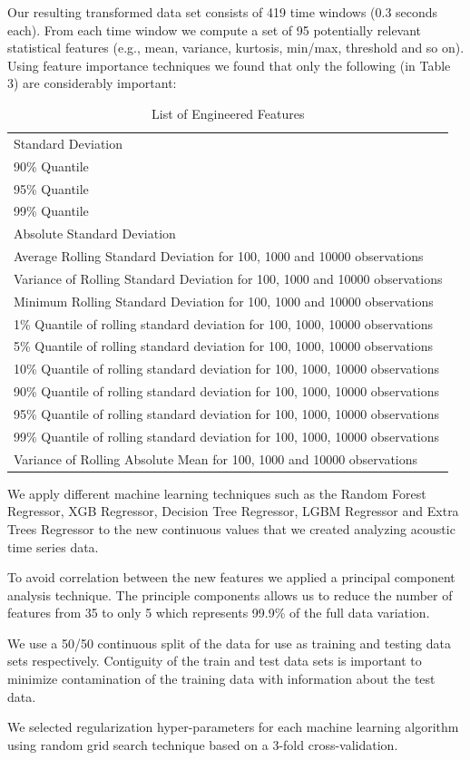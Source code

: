 \documentclass[]{llncs} %
\begin{document}
Our resulting transformed data set consists of 419 time windows (0.3 seconds each).  From each time window we compute a set of 95 potentially relevant statistical features (e.g., mean, variance, kurtosis, min/max, threshold and so on). Using feature importance techniques we found that only the following (in Table 3) are considerably important:
\begin{table}[H]
	\begin{center}
		\caption{List of Engineered Features}
		\label{tab:engineeredFeatrures}
		\begin{tabular}{l} 
Standard Deviation \\
90\% Quantile \\
95\% Quantile \\
99\% Quantile \\
Absolute Standard Deviation \\
Average Rolling Standard Deviation for 100, 1000 and 10000 observations \\
Variance of Rolling Standard Deviation for 100, 1000 and 10000 observations \\
Minimum Rolling Standard Deviation for 100, 1000 and 10000 observations \\
1\% Quantile of rolling standard deviation for 100, 1000, 10000 observations \\
5\% Quantile of rolling standard deviation for 100, 1000, 10000 observations \\
10\% Quantile of rolling standard deviation for 100, 1000, 10000 observations \\
90\% Quantile of rolling standard deviation for 100, 1000, 10000 observations \\
95\% Quantile of rolling standard deviation for 100, 1000, 10000 observations \\
99\% Quantile of rolling standard deviation for 100, 1000, 10000 observations \\
Variance of Rolling Absolute Mean for 100, 1000 and 10000 observations \\
		\end{tabular}
	\end{center}
\end{table}
We apply different machine learning techniques such as the Random Forest Regressor, XGB Regressor,  Decision Tree Regressor, LGBM Regressor and Extra Trees Regressor to the new continuous values that we created analyzing acoustic time series data. \par
To avoid correlation between the new features we applied a principal component analysis technique. The principle components allows us to reduce the number of features from 35 to only 5 which represents 99.9\% of the full data variation. \par
We use a 50/50 continuous split of the data for use as training and testing data sets respectively. Contiguity of the train and test data sets is important to minimize contamination of the training data with information about the test data. \par
We selected regularization hyper-parameters for each machine learning algorithm using random grid search technique based on a 3-fold cross-validation.
\end{document}
